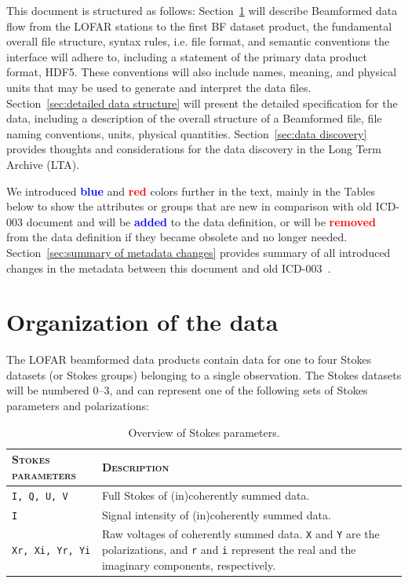 \documentclass[a4paper,10pt,bibtotoc]{scrartcl}
\begin{document}
This document is structured as follows: %
Section~\ref{sec:organization of the data} will describe Beamformed data flow from the LOFAR
stations to the first BF dataset product, the fundamental overall file structure, syntax rules, i.e. file format,
and semantic conventions the interface will adhere to, including a statement of the primary data product
format, HDF5. These conventions will also include names, meaning, and physical units that may be used to
generate and interpret the data files. Section~\ref{sec:detailed data structure} will present the detailed specification for the data, including a
description of the overall structure of a Beamformed file, file naming conventions, units, physical quantities. Section~\ref{sec:data discovery} provides
thoughts and considerations for the data discovery in the Long Term Archive (LTA).

We introduced \textcolor{blue}{\bf blue} and \textcolor{red}{\bf red} colors further in the text, mainly in the Tables below to show the attributes or groups
that are new in comparison with old ICD-003 document and will be \textcolor{blue}{\bf added} to the data definition,
or will be \textcolor{red}{\bf removed} from the data definition if they became obsolete and no longer needed. Section~\ref{sec:summary of metadata changes} provides
summary of all introduced changes in the metadata between this document and old ICD-003~\cite{lofar.icd.003}.






\section{Organization of the data}
\label{sec:organization of the data}
The LOFAR beamformed data products contain data for one to four Stokes datasets (or Stokes groups) belonging to a single observation. The Stokes datasets will be numbered 0--3, and can represent one of the following sets of Stokes parameters and polarizations:

\begin{table}[ht]
  \centering
  \begin{tabular}{|lp{10cm}|}
    \hline
    \textsc{Stokes parameters} & \textsc{Description} \\
    \hline \hline
    \verb|I, Q, U, V|     & Full Stokes of (in)coherently summed data. \\
    \verb|I|              & Signal intensity of (in)coherently summed data. \\
    \verb|Xr, Xi, Yr, Yi| & Raw voltages of coherently summed data. \verb|X| and \verb|Y| are the polarizations, and \verb|r| and \verb|i| represent the real and the imaginary components, respectively. \\
    \hline
  \end{tabular}
  \caption{Overview of Stokes parameters.}
  \label{tab:stokes}
\end{table}
\end{document}
